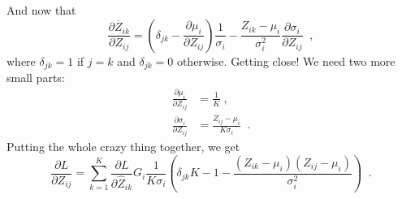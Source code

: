 And now that
\[
  \frac{\partial \overline{Z}_{ik}}{\partial Z_{ij}}  =
  \left(\delta_{jk} - \frac{\partial \mu_i}{\partial Z_{ij}}\right) \frac{1}{\sigma_i} -
  \frac{Z_{ik} - \mu_i}{\sigma_i^2} \frac{\partial \sigma_i}{\partial Z_{ij}} \;\;,
\]
where $\delta_{jk} = 1$ if $j = k$ and $\delta_{jk} = 0$ otherwise.
Getting close!  We need two more small parts:
\begin{align*}
  \frac{\partial \mu_i}{\partial Z_{ij}}    & = \frac{1}{K} \;, \\
  \frac{\partial \sigma_i}{\partial Z_{ij}} & =
  \frac{Z_{ij} - \mu_i}{K \sigma_i}\;\;.
\end{align*}
Putting the whole crazy thing together, we get
\[\frac{\partial L}{\partial Z_{ij}} =
  \sum_{k=1}^K\frac{\partial L}{\partial \widehat{Z}_{ik}}
  G_i\frac{1}{K \sigma_i}\left(\delta_{jk}K-1 - \frac{(Z_{ik} - \mu_i)(Z_{ij} - \mu_i)}{\sigma_i^2}
  \right)\;\;.
\]


